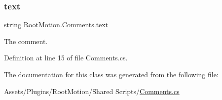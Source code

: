\subsubsection{\texorpdfstring{text}{text}}
{\footnotesize\ttfamily string Root\+Motion.\+Comments.\+text}



The comment. 



Definition at line 15 of file Comments.\+cs.



The documentation for this class was generated from the following file\+:\begin{DoxyCompactItemize}
\item 
Assets/\+Plugins/\+Root\+Motion/\+Shared Scripts/\mbox{\hyperlink{_comments_8cs}{Comments.\+cs}}\end{DoxyCompactItemize}
